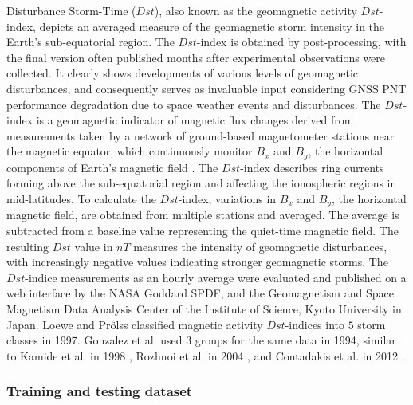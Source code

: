 \let\LaTeXcline\cline\documentclass[sn-mathphys-num]{sn-jnl}\let\cline\LaTeXcline
\begin{document}
Disturbance Storm-Time ($Dst$), also known as the geomagnetic activity $Dst$-index, depicts an averaged measure of the geomagnetic storm intensity in the Earth's sub-equatorial region. The $Dst$-index is obtained by post-processing, with the final version often published months after experimental observations were collected. It clearly shows developments of various levels of geomagnetic disturbances, and consequently serves as invaluable input considering GNSS PNT performance degradation due to space weather events and disturbances. The $Dst$-index is a geomagnetic indicator of magnetic flux changes derived from measurements taken by a network of ground-based magnetometer stations near the magnetic equator, which continuously monitor $B_{x}$ and $B_{y}$, the horizontal components of Earth's magnetic field \cite{zolesi2014ionospheric}. The $Dst$-index describes ring currents forming above the sub-equatorial region and affecting the ionospheric regions in mid-latitudes. To calculate the $Dst$-index, variations in $B_{x}$ and $B_{y}$, the horizontal magnetic field, are obtained from multiple stations and averaged. The average is subtracted from a baseline value representing the quiet-time magnetic field. The resulting $Dst$ value in $nT$ measures the intensity of geomagnetic disturbances, with increasingly negative values indicating stronger geomagnetic storms. The $Dst$-indice measurements as an hourly average were evaluated and published on a web interface by the NASA Goddard SPDF, and the Geomagnetism and Space Magnetism Data Analysis Center of the Institute of Science, Kyoto University in Japan. Loewe and Prölss \cite{loewe1997classification} classified magnetic activity $Dst$-indices into $5$ storm classes in 1997. Gonzalez et al. \cite{gonzalez1994geomagnetic} used $3$ groups for the same data in 1994, similar to Kamide et al. in 1998 \cite{kamide1998two}, Rozhnoi et al. in 2004 \cite{rozhnoi2004middle}, and Contadakis et al. in 2012 \cite{contadakis2012total}.

\subsubsection{Training and testing dataset}
\end{document}
